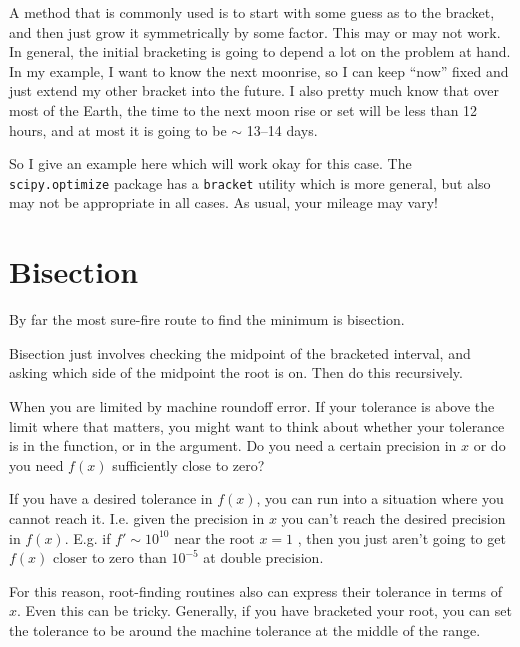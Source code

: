 A method that is commonly used is to start with some guess as to the
bracket, and then just grow it symmetrically by some factor. This may
or may not work. In general, the initial bracketing is going to depend
a lot on the problem at hand. In my example, I want to know the next
moonrise, so I can keep ``now'' fixed and just extend my other bracket
into the future. I also pretty much know that over most of the Earth,
the time to the next moon rise or set will be less than 12 hours, and
at most it is going to be $\sim$ 13--14 days.

So I give an example here which will work okay for this case. The {\tt
  scipy.optimize} package has a {\tt bracket} utility which is more
general, but also may not be appropriate in all cases. As usual, your
mileage may vary!

\section{Bisection}

By far the most sure-fire route to find the minimum is bisection. 


\begin{answer}
Bisection just involves checking the midpoint of the bracketed
interval, and asking which side of the midpoint the root is on. Then
do this recursively.
\end{answer}


\begin{answer}
When you are limited by machine roundoff error. If your tolerance is
above the limit where that matters, you might want to think about
whether your tolerance is in the function, or in the argument. Do you
need a certain precision in $x$ or do you need $f(x)$ sufficiently
close to zero? 

If you have a desired tolerance in $f(x)$, you can run into a
situation where you cannot reach it. I.e. given the precision in $x$
you can't reach the desired precision in $f(x)$. E.g. if $f' \sim
10^{10}$ near the root $x=1$ , then you just aren't going to get
$f(x)$ closer to zero than $10^{-5}$ at double precision.

For this reason, root-finding routines also can express their
tolerance in terms of $x$. Even this can be tricky. Generally, if you
have bracketed your root, you can set the tolerance to be around the
machine tolerance at the middle of the range.
\end{answer}

